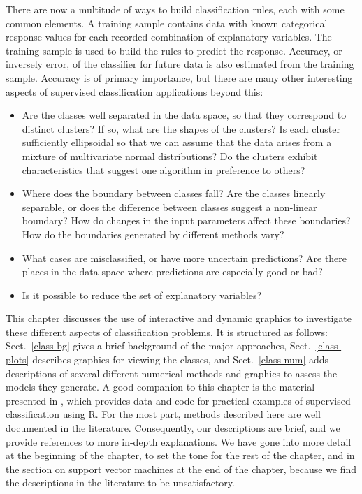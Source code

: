 There are now a multitude of ways to build classification rules, each
with some common elements. A training sample contains data with known
categorical response values for each recorded combination of
explanatory variables. The training sample is used to build the rules
to predict the response. Accuracy, or inversely error, of the
classifier for future data is also estimated from the training sample.
Accuracy is of primary importance, but there are many other
interesting aspects of supervised classification applications beyond
this:

\begin{itemize}
\item Are the classes well separated in the data space, so that they
correspond to distinct clusters?  If so, what are the shapes of the
clusters?  Is each cluster sufficiently ellipsoidal so that we can
assume that the data arises from a mixture of multivariate normal
distributions?  Do the clusters exhibit characteristics that suggest
one algorithm in preference to others?

\item Where does the boundary between classes fall?  Are the classes
linearly separable, or does the difference between classes suggest
a non-linear boundary?  How do changes in the input parameters affect
these boundaries? How do the boundaries generated by different methods
vary?

\item What cases are misclassified, or have more uncertain
predictions?  Are there places in the data space where predictions are
especially good or bad?

\item Is it possible to reduce the set of explanatory variables?
\end{itemize}

This chapter discusses the use of interactive and dynamic graphics to
investigate these different aspects of classification problems. It is
structured as follows: Sect.~\ref{class-bg} gives a brief background
of the major approaches, Sect.~\ref{class-plots} describes graphics
for viewing the classes, and Sect.~\ref{class-num} adds descriptions
of several different numerical methods and graphics to assess the
models they generate.  A good companion to this chapter is the
material presented in , which provides data and code
for practical examples of supervised classification using R. For the
most part, methods described here are well documented in the
literature. Consequently, our descriptions are brief, and we provide
references to more in-depth explanations.  We have gone into more
detail at the beginning of the chapter, to set the tone for the rest of
the chapter, and in the section on support vector machines at the end
of the chapter, because we find the descriptions in the literature to
be unsatisfactory.

